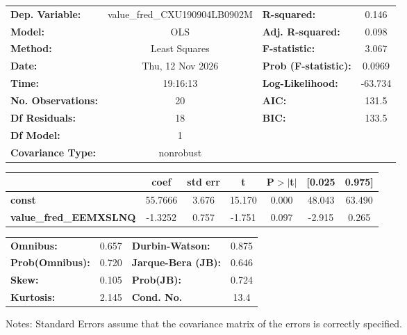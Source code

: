\begin{center}
\begin{tabular}{lclc}
\toprule
\textbf{Dep. Variable:}        & value\_fred\_CXU190904LB0902M & \textbf{  R-squared:         } &     0.146   \\
\textbf{Model:}                &              OLS              & \textbf{  Adj. R-squared:    } &     0.098   \\
\textbf{Method:}               &         Least Squares         & \textbf{  F-statistic:       } &     3.067   \\
\textbf{Date:}                 &        Thu, 12 Nov 2026       & \textbf{  Prob (F-statistic):} &   0.0969    \\
\textbf{Time:}                 &            19:16:13           & \textbf{  Log-Likelihood:    } &   -63.734   \\
\textbf{No. Observations:}     &                 20            & \textbf{  AIC:               } &     131.5   \\
\textbf{Df Residuals:}         &                 18            & \textbf{  BIC:               } &     133.5   \\
\textbf{Df Model:}             &                  1            & \textbf{                     } &             \\
\textbf{Covariance Type:}      &           nonrobust           & \textbf{                     } &             \\
\bottomrule
\end{tabular}
\begin{tabular}{lcccccc}
                               & \textbf{coef} & \textbf{std err} & \textbf{t} & \textbf{P$> |$t$|$} & \textbf{[0.025} & \textbf{0.975]}  \\
\midrule
\textbf{const}                 &      55.7666  &        3.676     &    15.170  &         0.000        &       48.043    &       63.490     \\
\textbf{value\_fred\_EEMXSLNQ} &      -1.3252  &        0.757     &    -1.751  &         0.097        &       -2.915    &        0.265     \\
\bottomrule
\end{tabular}
\begin{tabular}{lclc}
\textbf{Omnibus:}       &  0.657 & \textbf{  Durbin-Watson:     } &    0.875  \\
\textbf{Prob(Omnibus):} &  0.720 & \textbf{  Jarque-Bera (JB):  } &    0.646  \\
\textbf{Skew:}          &  0.105 & \textbf{  Prob(JB):          } &    0.724  \\
\textbf{Kurtosis:}      &  2.145 & \textbf{  Cond. No.          } &     13.4  \\
\bottomrule
\end{tabular}
\end{center}

Notes: \newline
 [1] Standard Errors assume that the covariance matrix of the errors is correctly specified.
